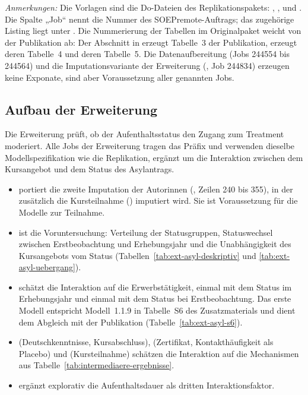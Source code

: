 \begin{table}[htbp]
  \vspace{0.75ex}
  \parbox{\textwidth}{\footnotesize
    \textit{Anmerkungen:} Die Vorlagen sind die Do-Dateien des Replikationspakets: , ,  und . Die Spalte „Job“ nennt die Nummer des SOEPremote-Auftrags; das zugehörige Listing liegt unter . Die Nummerierung der Tabellen im Originalpaket weicht von der Publikation ab: Der Abschnitt  in  erzeugt Tabelle~3 der Publikation,  erzeugt deren Tabelle~4 und  deren Tabelle~5. Die Datenaufbereitung (Jobs 244554 bis 244564) und die Imputationsvariante der Erweiterung (, Job 244834) erzeugen keine Exponate, sind aber Voraussetzung aller genannten Jobs.}
\end{table}

\subsection{Aufbau der Erweiterung}
\label{app:erweiterung}

Die Erweiterung prüft, ob der Aufenthaltsstatus den Zugang zum Treatment moderiert. Alle Jobs der Erweiterung tragen das Präfix  und verwenden dieselbe Modellspezifikation wie die Replikation, ergänzt um die Interaktion zwischen dem Kursangebot und dem Status des Asylantrags.

\begin{itemize}
  \item {} portiert die zweite Imputation der Autorinnen (, Zeilen 240 bis 355), in der zusätzlich die Kursteilnahme () imputiert wird. Sie ist Voraussetzung für die Modelle zur Teilnahme.
  \item {} ist die Voruntersuchung: Verteilung der Statusgruppen, Statuswechsel zwischen Erstbeobachtung und Erhebungsjahr und die Unabhängigkeit des Kursangebots vom Status (Tabellen~\ref{tab:ext-asyl-deskriptiv} und \ref{tab:ext-asyl-uebergang}).
  \item {} schätzt die Interaktion auf die Erwerbstätigkeit, einmal mit dem Status im Erhebungsjahr und einmal mit dem Status bei Erstbeobachtung. Das erste Modell entspricht Modell~1.1.9 in Tabelle~S6 des Zusatzmaterials und dient dem Abgleich mit der Publikation (Tabelle~\ref{tab:ext-asyl-s6}).
  \item {} (Deutschkenntnisse, Kursabschluss),  (Zertifikat, Kontakthäufigkeit als Placebo) und  (Kursteilnahme) schätzen die Interaktion auf die Mechanismen aus Tabelle~\ref{tab:intermediaere-ergebnisse}.
  \item {} ergänzt explorativ die Aufenthaltsdauer als dritten Interaktionsfaktor.
\end{itemize}

